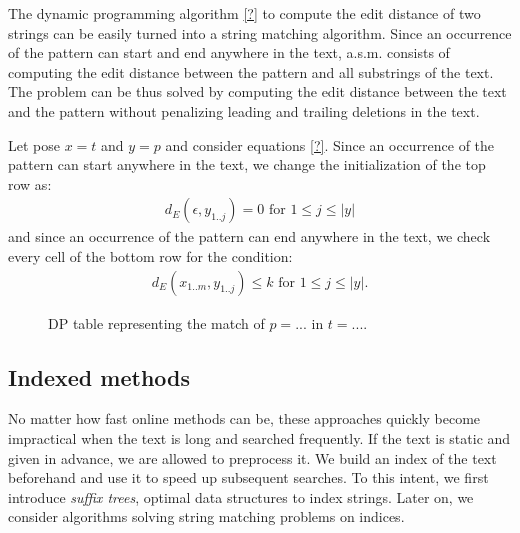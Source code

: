 The dynamic programming algorithm \ref{?} to compute the edit distance of two strings can be easily turned into a string matching algorithm.
Since an occurrence of the pattern can start and end anywhere in the text, a.s.m. consists of computing the edit distance between the pattern and all substrings of the text.
The problem can be thus solved by computing the edit distance between the text and the pattern without penalizing leading and trailing deletions in the text.

Let pose $x=t$ and $y=p$ and consider equations \ref{?}.
Since an occurrence of the pattern can start anywhere in the text, we change the initialization of the top row as:
\begin{eqnarray}
d_E(\epsilon, y_{1..j}) = 0 \text{ for } 1 \leq j \leq | y |
\end{eqnarray}
and since an occurrence of the pattern can end anywhere in the text, we check every cell of the bottom row for the condition:
\begin{eqnarray}
d_E(x_{1..m},y_{1..j}) \leq k \text{ for } 1 \leq j \leq | y |.
\end{eqnarray}

\begin{figure}[h]
\begin{center}
\caption{DP table representing the match of $p=...$ in $t=...$.}
\label{fig:asm-dp}

\end{center}
\end{figure}





\subsection{Indexed methods}

No matter how fast online methods can be, these approaches quickly become impractical when the text is long and searched frequently.
If the text is static and given in advance, we are allowed to preprocess it.
We build an index of the text beforehand and use it to speed up subsequent searches.
To this intent, we first introduce \emph{suffix trees}, optimal data structures to index strings.
Later on, we consider algorithms solving string matching problems on indices.

